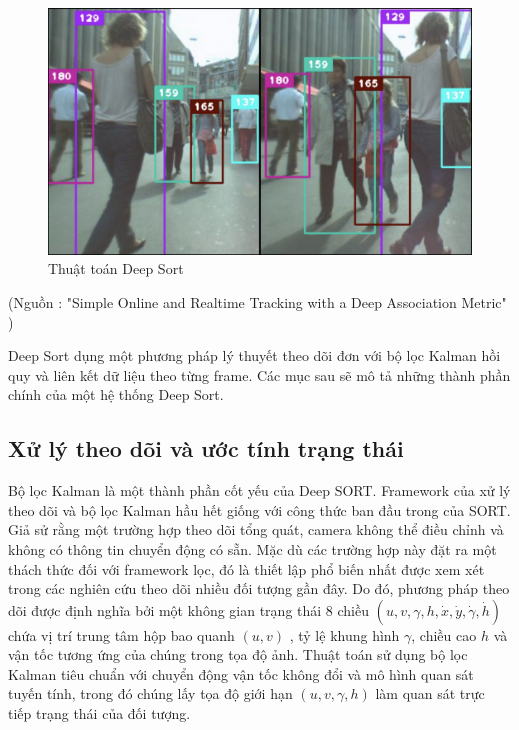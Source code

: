 \FloatBarrier
\begin{figure}[htp]
\begin{center}
\includegraphics[scale=0.3]{chap5/c5_figs/sort.png}
\end{center}
\caption{Thuật toán Deep Sort}
\label{fig:sort}
\end{figure}
\FloatBarrier
\centerline{(Nguồn : "Simple Online and Realtime Tracking with a Deep Association Metric" \cite{wojke2017simple})}

Deep Sort dụng một phương pháp lý thuyết theo dõi đơn với bộ lọc Kalman hồi quy và liên kết dữ liệu theo từng frame. Các mục sau sẽ mô tả những thành phần chính của một hệ thống Deep Sort.

\subsection{Xử lý theo dõi và ước tính trạng thái}
Bộ lọc Kalman là một thành phần cốt yếu của Deep SORT. Framework của xử lý theo dõi và bộ lọc Kalman hầu hết giống với công thức ban đầu trong của SORT. Giả sử rằng một trường hợp theo dõi tổng quát, camera không thể điều chỉnh và không có thông tin chuyển động có sẵn. Mặc dù các trường hợp này đặt ra một thách thức đối với framework lọc, đó là thiết lập phổ biến nhất được xem xét trong các nghiên cứu theo dõi nhiều đối tượng gần đây. Do đó, phương pháp theo dõi được định nghĩa bởi một không gian trạng thái 8 chiều $( u, v, \gamma , h,  \dot{x} , \dot{y}, \dot{\gamma}, \dot{h})$ chứa vị trí trung tâm hộp bao quanh $(u, v)$ , tỷ lệ khung hình $\gamma$, chiều cao $h$ và vận tốc tương ứng của chúng trong tọa độ ảnh. Thuật toán sử dụng bộ lọc Kalman tiêu chuẩn với chuyển động vận tốc không đổi và mô hình quan sát tuyến tính, trong đó chúng lấy tọa độ giới hạn
$( u, v, \gamma , h)$ làm quan sát trực tiếp trạng thái của đối tượng.

